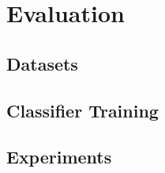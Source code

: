 \section{Evaluation}

\subsection{Datasets}

\subsection{Classifier Training}

\subsection{Experiments}
